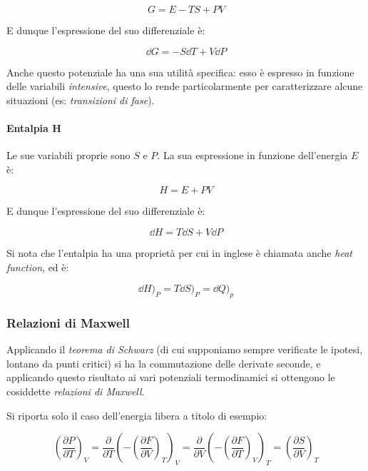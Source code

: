 \begin{equation*}
G = E - T S + P V
\end{equation*}

E dunque l'espressione del suo differenziale è:

\begin{equation*}
\dd G = - S \dd T + V \dd P
\end{equation*}

\begin{note}
	Anche questo potenziale ha una sua utilità specifica: esso è espresso in funzione delle variabili \textit{intensive}, questo lo rende particolarmente per caratterizzare alcune situazioni (es: \textit{transizioni di fase}).
\end{note}


\paragraph{Entalpia H}Le sue variabili proprie sono $S$ e $P$. La sua espressione in funzione dell'energia $E$ è:

\begin{equation*}
H = E + P V
\end{equation*}

E dunque l'espressione del suo differenziale è:

\begin{equation*}
\dd H = T \dd S + V \dd P
\end{equation*}

Si nota che l'entalpia ha una proprietà per cui in inglese è chiamata anche \textit{heat function}, ed è:

\begin{equation*}
\dd H)_P = T \dd S)_P = \dd Q)_p
\end{equation*}

\subsubsection{Relazioni di Maxwell}
Applicando il \textit{teorema di Schwarz} (di cui supponiamo sempre verificate le ipotesi, lontano da punti critici) si ha la commutazione delle derivate seconde, e applicando questo risultato ai vari potenziali termodinamici si ottengono le cosiddette \textit{relazioni di Maxwell}.

Si riporta solo il caso dell'energia libera a titolo di esempio:

\begin{equation*}
\left(\frac{\partial P}{\partial T}\right)_V = \frac{\partial}{\partial T} \left(- \left(\frac{\partial F}{\partial V}\right)_T\right)_V = \frac{\partial}{\partial V} \left(- \left(\frac{\partial F}{\partial T}\right)_V\right)_T = \left(\frac{\partial S}{\partial V}\right)_T
\end{equation*}

